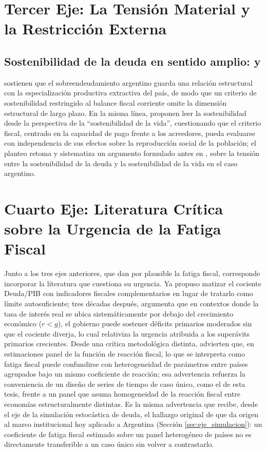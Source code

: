 \section{Tercer Eje: La Tensión Material y la Restricción Externa}

\subsection{Sostenibilidad de la deuda en sentido amplio: \texorpdfstring{\textcite{bohoslavsky2024}}{Bohoslavsky y Cantamutto (2024)} y \texorpdfstring{\textcite{cantamutto2024}}{Cantamutto et al. (2024)}}
\citet{bohoslavsky2024} sostienen que el sobreendeudamiento argentino guarda una relación estructural con la especialización productiva extractiva del país, de modo que un criterio de sostenibilidad restringido al balance fiscal corriente omite la dimensión estructural de largo plazo. En la misma línea, \citet{cantamutto2024} proponen leer la sostenibilidad desde la perspectiva de la ``sostenibilidad de la vida'', cuestionando que el criterio fiscal, centrado en la capacidad de pago frente a los acreedores, pueda evaluarse con independencia de sus efectos sobre la reproducción social de la población; el planteo retoma y sistematiza un argumento formulado antes en \citet{feliz2021}, sobre la tensión entre la sostenibilidad de la deuda y la sostenibilidad de la vida en el caso argentino.

\section{Cuarto Eje: Literatura Crítica sobre la Urgencia de la Fatiga Fiscal}

Junto a los tres ejes anteriores, que dan por plausible la fatiga fiscal, corresponde incorporar la literatura que cuestiona su urgencia. Ya \citet{blanchard1990} propuso matizar el cociente Deuda/PIB con indicadores fiscales complementarios en lugar de tratarlo como límite autosuficiente; tres décadas después, \textcite{blanchard2019} argumenta que en contextos donde la tasa de interés real se ubica sistemáticamente por debajo del crecimiento económico ($r<g$), el gobierno puede sostener déficits primarios moderados sin que el cociente diverja, lo cual relativiza la urgencia atribuida a los superávits primarios crecientes. Desde una crítica metodológica distinta, \citet{everaert2017} advierten que, en estimaciones panel de la función de reacción fiscal, lo que se interpreta como fatiga fiscal puede confundirse con heterogeneidad de parámetros entre países agrupados bajo un mismo coeficiente de reacción; esa advertencia refuerza la conveniencia de un diseño de series de tiempo de caso único, como el de esta tesis, frente a un panel que asuma homogeneidad de la reacción fiscal entre economías estructuralmente distintas. Es la misma advertencia que recibe, desde el eje de la simulación estocástica de deuda, el hallazgo original de \citet{medeiros2012} que da origen al marco institucional hoy aplicado a Argentina (Sección \ref{sec:eje_simulacion}): un coeficiente de fatiga fiscal estimado sobre un panel heterogéneo de países no es directamente transferible a un caso único sin volver a contrastarlo.

